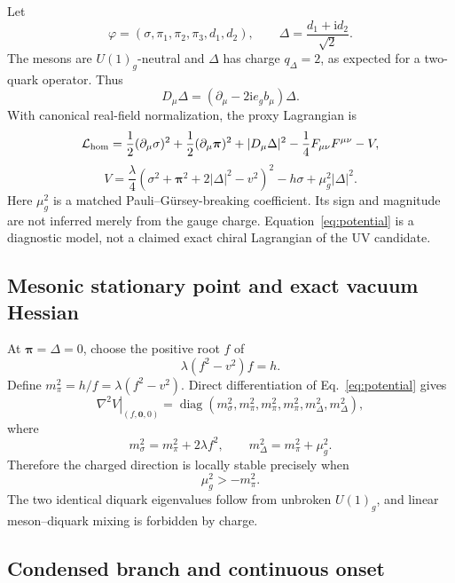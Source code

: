 \documentclass[11pt]{article}
\theoremstyle{definition}
\theoremstyle{remark}
\newcommand{\ii}{\mathrm i}
\newcommand{\cL}{\mathcal L}
\begin{document}
Let
\[
 \varphi=(\sigma,\pi_1,\pi_2,\pi_3,d_1,d_2),\qquad
 \Delta=\frac{d_1+\ii d_2}{\sqrt2}.
\]
The mesons are \(U(1)_g\)-neutral and \(\Delta\) has charge
\(q_\Delta=2\), as expected for a two-quark operator.  Thus
\[
 D_\mu\Delta=(\partial_\mu-2\ii e_g b_\mu)\Delta.
\]
With canonical real-field normalization, the proxy Lagrangian is
\begin{equation}
 \cL_{\rm hom}
 =\frac12(\partial_\mu\sigma)^2+\frac12(\partial_\mu\bm\pi)^2
 +|D_\mu\Delta|^2-\frac14F_{\mu\nu}F^{\mu\nu}-V,
 \label{eq:hom-lagrangian}
\end{equation}
\begin{equation}
 V=\frac{\lambda}{4}
 \left(\sigma^2+\bm\pi^2+2|\Delta|^2-v^2\right)^2
 -h\sigma+\mu_g^2|\Delta|^2.
 \label{eq:potential}
\end{equation}
Here \(\mu_g^2\) is a matched Pauli--G\"ursey-breaking coefficient.  Its
sign and magnitude are not inferred merely from the gauge charge.
Equation~\eqref{eq:potential} is a diagnostic model, not a claimed exact
chiral Lagrangian of the UV candidate.

\subsection{Mesonic stationary point and exact vacuum Hessian}

At \(\bm\pi=\Delta=0\), choose the positive root \(f\) of
\begin{equation}
 \lambda(f^2-v^2)f=h.
 \label{eq:f-equation}
\end{equation}
Define \(m_\pi^2=h/f=\lambda(f^2-v^2)\).  Direct differentiation of
Eq.~\eqref{eq:potential} gives
\begin{equation}
 \left.\nabla^2V\right|_{(f,\bm0,0)}
 =\operatorname{diag}\left(
 m_\sigma^2,
 m_\pi^2,m_\pi^2,m_\pi^2,
 m_\Delta^2,m_\Delta^2\right),
 \label{eq:vacuum-hessian}
\end{equation}
where
\begin{equation}
 m_\sigma^2=m_\pi^2+2\lambda f^2,\qquad
 m_\Delta^2=m_\pi^2+\mu_g^2.
 \label{eq:gaps}
\end{equation}
Therefore the charged direction is locally stable precisely when
\begin{equation}
 \mu_g^2>-m_\pi^2.
 \label{eq:local-phase-boundary}
\end{equation}
The two identical diquark eigenvalues follow from unbroken \(U(1)_g\), and
linear meson--diquark mixing is forbidden by charge.

\subsection{Condensed branch and continuous onset}
\end{document}
